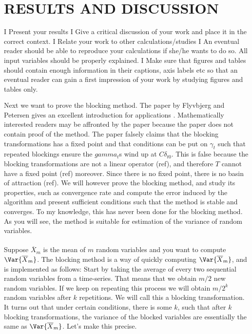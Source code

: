 \documentclass[11pt,english,a4paper]{article}
\begin{document}
\section*{\uppercase{Results and discussion}}

I Present your results
I Give a critical discussion of your work and place it in the
correct context.
I Relate your work to other calculations/studies
I An eventual reader should be able to reproduce your
calculations if she/he wants to do so. All input variables
should be properly explained.
I Make sure that figures and tables should contain enough
information in their captions, axis labels etc so that an
eventual reader can gain a first impression of your work by
studying figures and tables only.

Next we want to prove the blocking method. The paper by Flyvbjerg and Petersen gives an excellent introduction for applications \parencite[461-466]{flyvbjerg_error_1989}. Mathematically interested readers may be affronted by the paper because the paper does not contain proof of the method. The paper falsely claims that the blocking transformations has a fixed point and that conditions can be put on $\gamma_t$ such that repeated blockings ensure the $gamma_t$s wind up at $C\delta_{t0}$. This is false because the blocking transformations are not a linear operator (ref), and therefore $T$ cannot have a fixed point (ref) moreover. Since there is no fixed point, there is no basin of attraction (ref). We will however prove the blocking method, and study its properties, such as convergence rate and compute the error induced by the algorithm and present sufficient conditions such that the method is stable and converges. To my knowledge, this has never been done for the blocking method. As you will see, the method is suitable for estimation of the variance of random variables.
\\
\\
Suppose $\overline X_m$ is the mean of $m$ random variables and you want to compute $\Var{\overline X_m}$. The blocking method is a way of quickly computing $\Var{\overline X_m}$, and is implemented as follows: Start by taking the average of every two sequential random variables from a time-series. That means that we obtain $m/2$ new random variables. If we keep on repeating this process we will obtain $m/2^k$ random variables after $k$ repetitions. We will call this a blocking transformation. It turns out that under certain conditions, there is some $k$, such that after $k$ blocking transformations, the variance of the blocked variables are essentially the same as $\Var{\overline X_m}$. Let's make this precise.\\
\end{document}
